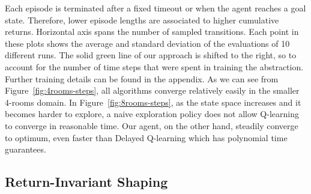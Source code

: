 \documentclass[letterpaper]{article} %
\theoremstyle{plain}
\theoremstyle{definition}
\theoremstyle{remark}
\newcommand{\Policy}{\rho}
\newcommand{\Est}[1]{\hat{#1}}
\begin{document}
Each episode is terminated after a fixed timeout or when the agent reaches a goal state.
Therefore, lower episode lengths are associated to higher cumulative returns.
Horizontal axis spans the number of sampled transitions.
Each point in these plots shows the average and standard deviation of the evaluations of 10 different runs.
The solid green line of our approach is shifted to the right, so to account for the number of time steps that were spent in training the abstraction.
Further training details can be found in the appendix.
%
As we can see from Figure~\ref{fig:4rooms-steps}, all algorithms converge relatively easily in the smaller 4-rooms domain.
In Figure~\ref{fig:8rooms-steps}, as the state space increases and it becomes harder to explore, a naive exploration policy does not allow Q-learning to converge in reasonable time.
Our agent, on the other hand, steadily converge to optimum, even faster than Delayed Q-learning which has polynomial time guarantees.


\subsection{Return-Invariant Shaping}
\end{document}
